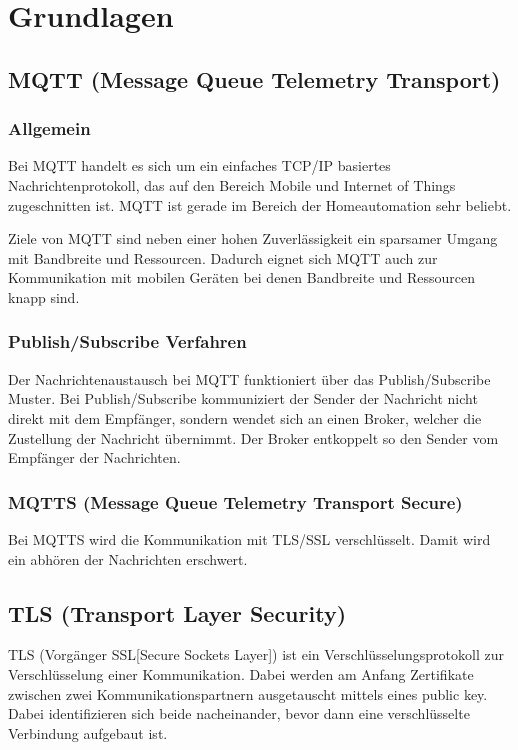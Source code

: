 \chapter{Grundlagen}
\label{cha:Grundlagen}

\section{MQTT (Message Queue Telemetry Transport)}

\subsection{Allgemein}
Bei MQTT handelt es sich um ein einfaches TCP/IP basiertes Nachrichtenprotokoll, das auf den Bereich Mobile und Internet of Things zugeschnitten ist. MQTT ist gerade im Bereich der Homeautomation sehr beliebt.

Ziele von MQTT sind neben einer hohen Zuverlässigkeit ein sparsamer Umgang mit Bandbreite und Ressourcen. Dadurch eignet sich MQTT auch zur Kommunikation mit mobilen Geräten bei denen Bandbreite und Ressourcen knapp sind.

\subsection{Publish/Subscribe Verfahren}
Der Nachrichtenaustausch bei MQTT funktioniert über das Publish/Subscribe Muster. Bei Publish/Subscribe kommuniziert der Sender der Nachricht nicht direkt mit dem Empfänger, sondern wendet sich an einen Broker, welcher die Zustellung der Nachricht übernimmt. Der Broker entkoppelt so den Sender vom Empfänger der Nachrichten.

\subsection{MQTTS (Message Queue Telemetry Transport Secure)}
Bei MQTTS wird die Kommunikation mit TLS/SSL verschlüsselt. Damit wird ein abhören der Nachrichten erschwert.

\section{TLS (Transport Layer Security)}
TLS (Vorgänger SSL[Secure Sockets Layer]) ist ein Verschlüsselungsprotokoll zur Verschlüsselung einer Kommunikation. Dabei werden am Anfang Zertifikate zwischen zwei Kommunikationspartnern ausgetauscht mittels eines public key. Dabei identifizieren sich beide nacheinander, bevor dann eine verschlüsselte Verbindung aufgebaut ist.


